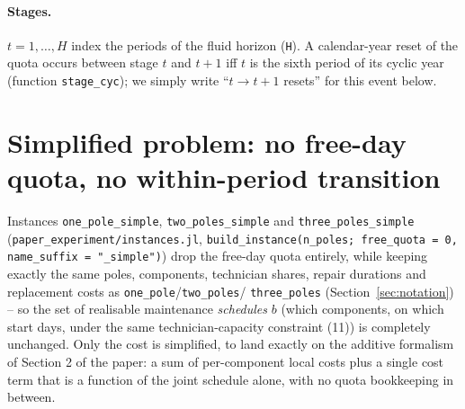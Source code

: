 \documentclass[11pt]{article}
\begin{document}
\paragraph{Stages.} $t = 1,\dots,H$ index the periods of the fluid horizon
(\texttt{H}). A calendar-year reset of the quota occurs between stage $t$ and $t+1$ iff
$t$ is the sixth period of its cyclic year (function \texttt{stage\_cyc}); we simply write
``$t \!\to\! t{+}1$ resets'' for this event below.

\section{Simplified problem: no free-day quota, no within-period transition}
\label{sec:simplified}

Instances \texttt{one\_pole\_simple}, \texttt{two\_poles\_simple} and
\texttt{three\_poles\_simple} (\texttt{paper\_experiment/instances.jl},
\texttt{build\_instance(n\_poles; free\_quota = 0, name\_suffix = "\_simple")}) drop the
free-day quota entirely, while keeping exactly the same poles, components, technician
shares, repair durations and replacement costs as \texttt{one\_pole}/\texttt{two\_poles}/
\texttt{three\_poles} (Section~\ref{sec:notation}) -- so the set of realisable maintenance
\emph{schedules} $b$ (which components, on which start days, under the same
technician-capacity constraint (11)) is completely unchanged. Only the cost is simplified,
to land exactly on the additive formalism of Section 2 of the paper: a sum of per-component
local costs plus a single cost term that is a function of the joint schedule alone, with no
quota bookkeeping in between.
\end{document}

